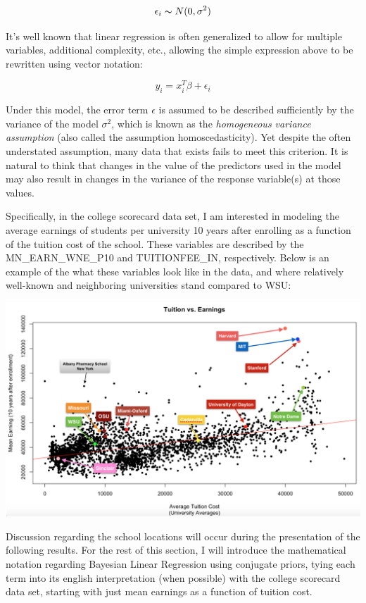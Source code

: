 \documentclass[10pt]{article}
\begin{document}
$$ \epsilon_i \thicksim N(0, \sigma^2) $$

It's well known that linear regression is often generalized to allow for multiple variables, additional complexity, etc., allowing the simple expression above to be rewritten using vector notation: 

$$ y_i = x_{i}^T \beta + \epsilon_i $$

Under this model, the error term $\epsilon$ is assumed to be described sufficiently by the variance of the model $\sigma^2$, which is known as the {\it homogeneous variance assumption} (also called the assumption homoscedasticity). Yet despite the often understated assumption, many data that exists fails to meet this criterion. It is natural to think that changes in the value of the predictors used in the model may also result in changes in the variance of the response variable(s) at those values. 

Specifically, in the college scorecard data set, I am interested in modeling the average earnings of students per university 10 years after enrolling as a function of the tuition cost of the school. These variables are described by the MN\_EARN\_WNE\_P10 and TUITIONFEE\_IN, respectively. Below is an example of the what these variables look like in the data, and where relatively well-known and neighboring universities stand compared to WSU: 

\includegraphics[width=\textwidth]{figures/schools2}

Discussion regarding the school locations will occur during the presentation of the following results. For the rest of this section, I will introduce the mathematical notation regarding Bayesian Linear Regression using conjugate priors, tying each term into its english interpretation (when possible) with the college scorecard data set, starting with just mean earnings as a function of tuition cost. 
\end{document}
